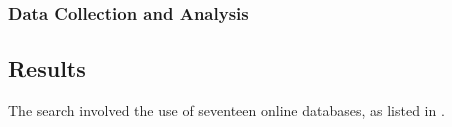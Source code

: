 
\subsubsection{Data Collection and Analysis} %
\label{ssub:data_collection_and_analysis}




\subsection{Results} %
\label{sub:review_results}

The search involved the use of seventeen online databases, as listed in .

